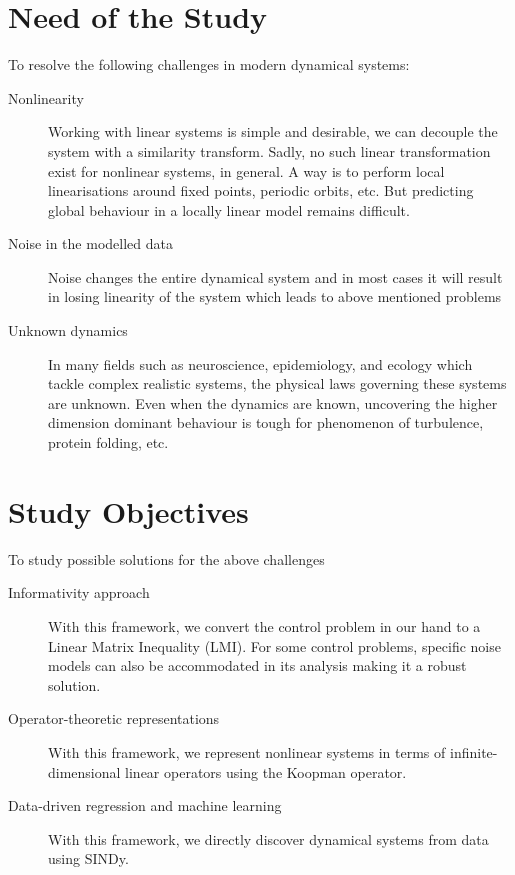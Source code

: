 \section{Need of the Study}
To resolve the following challenges in modern dynamical systems:
\begin{description}
\item[Nonlinearity]
Working with linear systems is simple and desirable, we can decouple the system with a similarity transform. Sadly, no such linear transformation exist for nonlinear systems, in general. A way is to perform local linearisations around fixed points, periodic orbits, etc. But predicting global behaviour in a locally linear model remains difficult.
\item[Noise in the modelled data]
Noise changes the entire dynamical system and in most cases it will result in losing linearity of the system which leads to above mentioned problems
\item[Unknown dynamics] In many fields such as neuroscience, epidemiology, and ecology which tackle complex realistic systems, the physical laws governing these systems are unknown. Even when the dynamics are known, uncovering the higher dimension dominant behaviour is tough for phenomenon of turbulence, protein folding, etc.
\end{description}
\section{Study Objectives}
To study possible solutions for the above challenges
\begin{description}
    \item[Informativity approach] With this framework, we convert the control problem in our hand to a Linear Matrix Inequality (LMI). For some control problems, specific noise models can also be accommodated in its analysis making it a robust solution.
    \item[Operator-theoretic representations] With this framework, we represent nonlinear systems in terms of infinite-dimensional linear operators using the Koopman operator.
    \item[Data-driven regression and machine learning] With this framework, we directly discover dynamical systems from data using SINDy.%
\end{description}